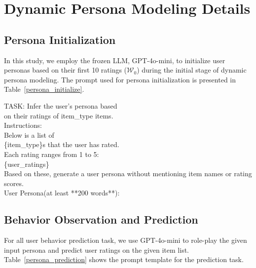 
\section{Dynamic Persona Modeling Details}
\subsection{Persona Initialization}
In this study, we employ the frozen LLM, GPT-4o-mini, to initialize user personas based on their first 10 ratings ($\mathcal{W}_0$) during the initial stage of dynamic persona modeling. The prompt used for persona initialization is presented in Table~\ref{persona_initialize}.

\begin{tcolorbox}
{\selectfont\small
TASK: Infer the user's persona based \\
on their ratings of {item\_type} items.\\
Instructions: \\
Below is a list of \\
\{item\_type\}s that the user has rated. \\
Each rating ranges from 1 to 5:\\
\{user\_ratings\}\\

Based on these, generate a user persona without mentioning item names or rating scores. 
\\
User Persona(at least  **200 words**):}
\end{tcolorbox}
\noindent\begin{minipage}{0.48\textwidth}
\label{persona_initialize}
\end{minipage}

\subsection{Behavior Observation and Prediction}
For all user behavior prediction task, we use GPT-4o-mini to role-play the given input persona and predict user ratings on the given item list. Table~\ref{persona_prediction} shows the prompt template for the prediction task.

